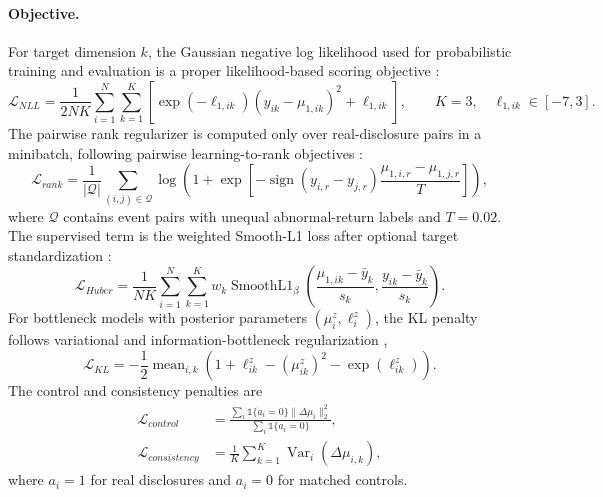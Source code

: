 \documentclass[10pt,letterpaper]{article}
\begin{document}
\paragraph{Objective.}
For target dimension \(k\), the Gaussian negative log likelihood used for probabilistic training
and evaluation is a proper likelihood-based scoring objective \citep{gneiting2007strictly}:
\begin{equation}
    \mathcal{L}_{NLL}
    = \frac{1}{2NK}\sum_{i=1}^{N}\sum_{k=1}^{K}
    \left[\exp(-\ell_{1,ik})(y_{ik}-\mu_{1,ik})^2+\ell_{1,ik}\right],
    \qquad K=3,\quad \ell_{1,ik}\in[-7,3].
\end{equation}
The pairwise rank regularizer is computed only over real-disclosure pairs in a minibatch, following
pairwise learning-to-rank objectives \citep{burges2005learning,cao2007learning}:
\begin{equation}
    \mathcal{L}_{rank}
    = \frac{1}{|\mathcal{Q}|}\sum_{(i,j)\in\mathcal{Q}}
    \log\left(1+\exp\left[
    -\operatorname{sign}(y_{i,r}-y_{j,r})
    \frac{\mu_{1,i,r}-\mu_{1,j,r}}{T}
    \right]\right),
\end{equation}
where \(\mathcal{Q}\) contains event pairs with unequal abnormal-return labels and \(T=0.02\).
The supervised term is the weighted Smooth-L1 loss after optional target standardization
\citep{huber1964robust}:
\begin{equation}
    \mathcal{L}_{Huber}
    =
    \frac{1}{NK}\sum_{i=1}^{N}\sum_{k=1}^{K}
    w_k\operatorname{SmoothL1}_{\beta}
    \left(\frac{\mu_{1,ik}-\bar{y}_k}{s_k},
    \frac{y_{ik}-\bar{y}_k}{s_k}\right).
\end{equation}
For bottleneck models with posterior parameters \((\mu^z_i,\ell^z_i)\), the KL penalty follows
variational and information-bottleneck regularization \citep{kingma2013autoencoding,
tishby2000information},
\begin{equation}
    \mathcal{L}_{KL}
    = -\frac{1}{2}\operatorname{mean}_{i,k}
    \left(1+\ell^z_{ik}-(\mu^z_{ik})^2-\exp(\ell^z_{ik})\right).
\end{equation}
The control and consistency penalties are
\begin{align}
    \mathcal{L}_{control}
    &=
    \frac{\sum_i\mathbb{1}\{a_i=0\}\lVert\Delta\mu_i\rVert_2^2}
    {\sum_i\mathbb{1}\{a_i=0\}},\\
    \mathcal{L}_{consistency}
    &= \frac{1}{K}\sum_{k=1}^{K}\operatorname{Var}_i(\Delta\mu_{i,k}),
\end{align}
where \(a_i=1\) for real disclosures and \(a_i=0\) for matched controls.
\end{document}
